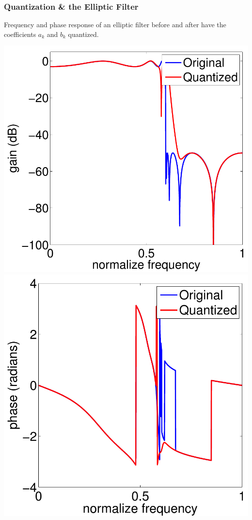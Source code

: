 \documentclass[mathserif,9pt]{beamer}
\begin{document}
\begin{frame}\frametitle{Quantization \& the Elliptic Filter}\small
  \begin{center}
    Frequency and phase response of an elliptic filter before and after have the coefficients $a_k$ and 
    $b_k$ quantized. \\
    \vspace{1em}
    
    \includegraphics[height=.55\textheight]{ellip_freq.pdf} \hspace{1em}
    \includegraphics[height=.55\textheight]{ellip_phase.pdf}
  \end{center}
\end{frame}
\end{document}
